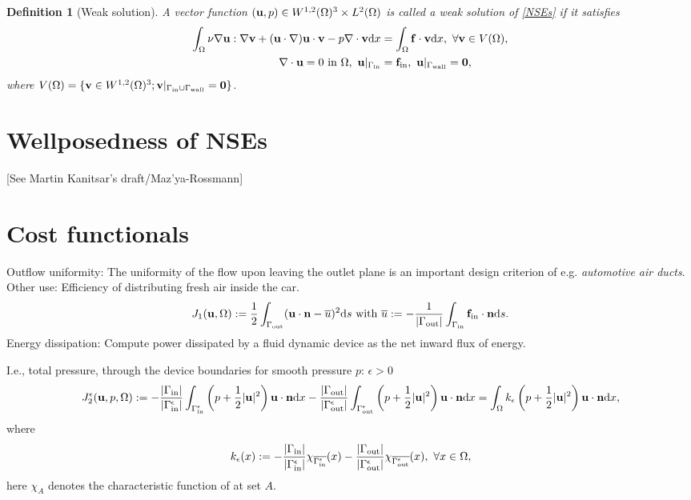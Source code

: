 \documentclass[oneside,11pt]{book}
\numberwithin{equation}{section}
\newtheorem{definition}{Definition}[section]
\begin{document}
\begin{definition}[Weak solution]
    A vector function $({\bf u},p)\in W^{1,2}(\Omega)^3\times L^2(\Omega)$ is called a \emph{weak solution} of \eqref{NSEs} if it satisfies
    \begin{align}
        \int_\Omega \nu\nabla{\bf u}:\nabla{\bf v} + ({\bf u}\cdot\nabla){\bf u}\cdot{\bf v} - p\nabla\cdot{\bf v}{\rm d}x &= \int_\Omega {\bf f}\cdot{\bf v}{\rm d}x,\ \forall{\bf v}\in V(\Omega),\\
        \nabla\cdot{\bf u} = 0 \mbox{ in } \Omega,\ {\bf u}|_{\Gamma_{\rm in}} &= {\bf f}_{\rm in},\ {\bf u}|_{\Gamma_{\rm wall}} = {\bf 0},
    \end{align}
    where $V(\Omega) = \{{\bf v}\in W^{1,2}(\Omega)^3;{\bf v}|_{\Gamma_{\rm in}\cup\Gamma_{\rm wall}} = {\bf 0}\}$.
\end{definition}

\section{Wellposedness of NSEs}
[See Martin Kanitsar's draft/Maz'ya-Rossmann]

\section{Cost functionals}
Outflow uniformity: The uniformity of the flow upon leaving the outlet plane is an important design criterion of e.g. \textit{automotive air ducts}. Other use: Efficiency of distributing fresh air inside the car.
\begin{align}
    J_1({\bf u},\Omega) := \frac{1}{2}\int_{\Gamma_{\rm out}} ({\bf u}\cdot{\bf n} - \overline{u})^2{\rm d}s \mbox{ with } \overline{u} := -\frac{1}{|\Gamma_{\rm out}|}\int_{\Gamma_{\rm in}} {\bf f}_{\rm in}\cdot{\bf n}{\rm d}s.
\end{align}
Energy dissipation: Compute power dissipated by a fluid dynamic device as the net inward flux of energy.

I.e., total pressure, through the device boundaries for smooth pressure $p$: $\epsilon > 0$
\begin{align}
    J_2^\epsilon({\bf u},p,\Omega) := -\frac{|\Gamma_{\rm in}|}{|\Gamma_{\rm in}^\epsilon|}\int_{\Gamma_{\rm in}^\epsilon} \left(p + \frac{1}{2}|{\bf u}|^2\right){\bf u}\cdot{\bf n}{\rm d}x - \frac{|\Gamma_{\rm out}|}{|\Gamma_{\rm out}^\epsilon|}\int_{\Gamma_{\rm out}^\epsilon} \left(p + \frac{1}{2}|{\bf u}|^2\right){\bf u}\cdot{\bf n}{\rm d}x = \int_\Omega k_\epsilon\left(p + \frac{1}{2}|{\bf u}|^2\right){\bf u}\cdot{\bf n}{\rm d}x,
\end{align}
where
\begin{align}
    k_\epsilon(x):= -\frac{|\Gamma_{\rm in}|}{|\Gamma_{\rm in}^\epsilon|}\chi_{\overline{\Gamma_{\rm in}^\epsilon}}(x) - \frac{|\Gamma_{\rm out}|}{|\Gamma_{\rm out}^\epsilon|}\chi_{\overline{\Gamma_{\rm out}^\epsilon}}(x),\ \forall x\in\Omega,
\end{align}
here $\chi_A$ denotes the characteristic function of at set $A$.
\end{document}
